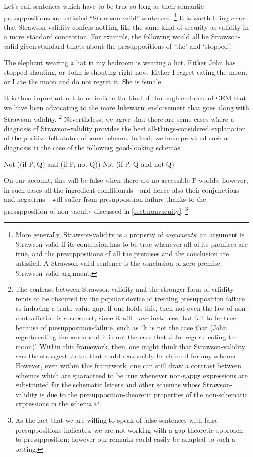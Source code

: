 \documentclass[If.tex]{subfiles}
\begin{document}
Let's call sentences which have to be true so long as their semantic presuppositions are satisfied “Strawson-valid” sentences.%
\footnote{More generally, Strawson-validity is a property of \emph{arguments}: an argument is Strawson-valid if its conclusion has to be true whenever all of its premises are true, and the presuppositions of all the premises and the conclusion are satisfied.  A Strawson-valid sentence is the conclusion of zero-premise Strawson-valid argument.}
It is worth being clear that Strawson-validity confers nothing like the same kind of security as validity in a more standard conception.  For example, the following would all be Strawson-valid given standard tenets about the presuppositions of ‘the’ and ‘stopped’:
\begin{prop}
	\nitem
	The elephant wearing a hat in my bedroom is wearing a hat.
	\nitem
	Either John has stopped shouting, or John is shouting right now.
	\nitem
	Either I regret eating the moon, or I ate the moon and do not regret it.  
	\nitem
	She is female.
\end{prop}
It is thus important not to assimilate the kind of thorough embrace of CEM that we have been advocating to the more lukewarm endorsement that goes along with Strawson-validity.%
\footnote{The contrast between Strawson-validity and the stronger form of validity tends to be obscured by the popular device of treating presupposition failure as inducing a truth-value gap.  If one holds this, then not even the law of non-contradiction is sacrosanct, since it will have instances that fail to be true because of presupposition-failure, such as ‘It is not the case that (John regrets eating the moon and it is not the case that John regrets eating the moon)’.  Within this framework, then, one might think that Strawson-validity was the strongest status that could reasonably be claimed for any schema.  However, even within this framework, one can still draw a contrast between schemas which are guaranteed to be true whenever non-gappy expressions are substituted for the schematic letters and other schemas whose Strawson-validity is due to the presupposition-theoretic properties of the non-schematic expressions in the schema.}
Nevertheless, we agree that there are some cases where a diagnosis of Strawson-validity provides the best all-things-considered explanation of the positive felt status of some schema.  Indeed, we have provided such a diagnosis in the case of the following good-looking schemas:
\begin{prop}
	\sitem[CNC]
	Not ((if P, Q) and (if P, not Q))
	\sitem[CNC*]
	Not (if P, Q and not Q)
\end{prop}
On our account, this will be false when there are no accessible P-worlds; however, in such cases all the ingredient conditionals---and hence also their conjunctions and negations---will suffer from presupposition failure thanks to the presupposition of non-vacuity discussed in \autoref{sect:nonvacuity}.%
\footnote{As the fact that we are willing to speak of false sentences with false presuppositions indicates, we are not working with a gap-theoretic approach to presupposition; however our remarks could easily be adapted to such a setting.}  
\end{document}

